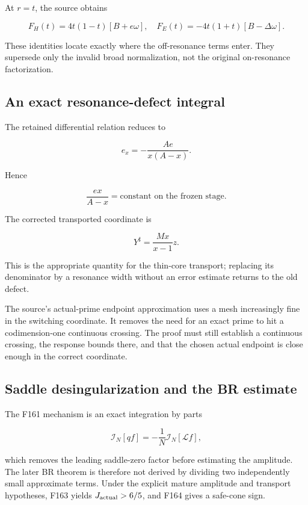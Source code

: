 \documentclass[
  10pt,
  a4paper,
  10pt,
  oneside,
  openany]{book}
\begin{document}
At \(r=t\), the source obtains

\[
 F_H(t)=4t(1-t)[B+e\omega],\quad
 F_E(t)=-4t(1+t)[B-\Delta\omega].
 \tag{36.3}\label{eq:36.3}
\]

These identities locate exactly where the off-resonance terms enter.
They supersede only the invalid broad normalization, not the original
on-resonance factorization.

\subsection{An exact resonance-defect
integral}\label{an-exact-resonance-defect-integral}

The retained differential relation reduces to

\[
 e_x=-\frac{Ae}{x(A-x)}.
\]

Hence

\[
 \boxed{\frac{ex}{A-x}=\text{constant on the frozen stage}.}
 \tag{36.4}\label{eq:36.4}
\]

The corrected transported coordinate is

\[
 Y^\sharp=\frac{Mx}{x-1}z.
 \tag{36.5}\label{eq:36.5}
\]

This is the appropriate quantity for the thin-core transport; replacing
its denominator by a resonance width without an error estimate returns
to the old defect.

The source's actual-prime endpoint approximation uses a mesh
increasingly fine in the switching coordinate. It removes the need for
an exact prime to hit a codimension-one continuous crossing. The proof
must still establish a continuous crossing, the response bounds there,
and that the chosen actual endpoint is close enough in the correct
coordinate.

\subsection{Saddle desingularization and the BR
estimate}\label{saddle-desingularization-and-the-br-estimate}

The F161 mechanism is an exact integration by parts

\[
 \mathcal I_N[qf]=-\frac{1}{N}\mathcal I_N[\mathcal Lf],
 \tag{36.6}\label{eq:36.6}
\]

which removes the leading saddle-zero factor before estimating the
amplitude. The later BR theorem is therefore not derived by dividing two
independently small approximate terms. Under the explicit mature
amplitude and transport hypotheses, F163 yields \(J_{\rm actual}>6/5\),
and F164 gives a safe-cone sign.
\end{document}
